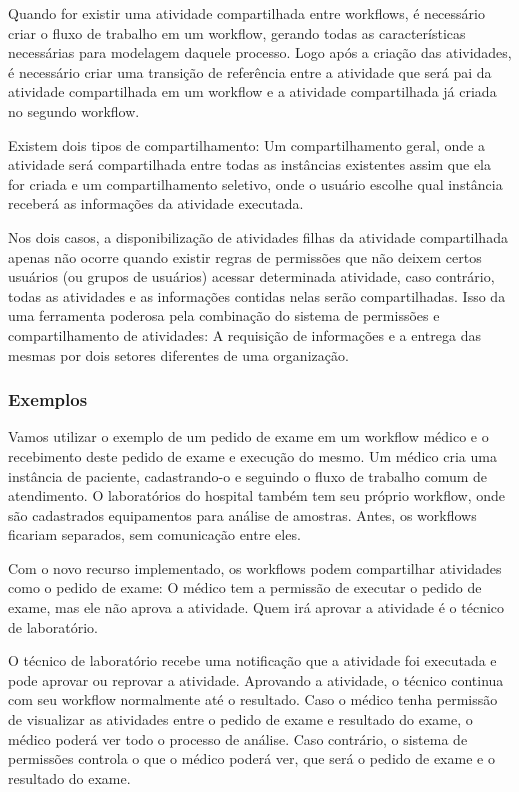 Quando for existir uma atividade compartilhada entre workflows, é necessário criar o fluxo de trabalho em um workflow, gerando todas as características necessárias para modelagem daquele processo. Logo após a criação das atividades, é necessário criar uma transição de referência entre a atividade que será pai da atividade compartilhada em um workflow e a atividade compartilhada já criada no segundo workflow.

Existem dois tipos de compartilhamento: Um compartilhamento geral, onde a atividade será compartilhada entre todas as instâncias existentes assim que ela for criada e um compartilhamento seletivo, onde o usuário escolhe qual instância receberá as informações da atividade executada.

Nos dois casos, a disponibilização de atividades filhas da atividade compartilhada apenas não ocorre quando existir regras de permissões que não deixem certos usuários (ou grupos de usuários) acessar determinada atividade, caso contrário, todas as atividades e as informações contidas nelas serão compartilhadas.
Isso da uma ferramenta poderosa pela combinação do sistema de permissões e compartilhamento de atividades: A requisição de informações e a entrega das mesmas por dois setores diferentes de uma organização.

\subsubsection{Exemplos}

Vamos utilizar o exemplo de um pedido de exame em um workflow médico e o recebimento deste pedido de exame e execução do mesmo.
Um médico cria uma instância de paciente, cadastrando-o e seguindo o fluxo de trabalho comum de atendimento.
O laboratórios do hospital também tem seu próprio workflow, onde são cadastrados equipamentos para análise de amostras.
Antes, os workflows ficariam separados, sem comunicação entre eles.

Com o novo recurso implementado, os workflows podem compartilhar atividades como o pedido de exame: O médico tem a permissão de executar o pedido de exame, mas ele não aprova a atividade. Quem irá aprovar a atividade é o técnico de laboratório.

O técnico de laboratório recebe uma notificação que a atividade foi executada e pode aprovar ou reprovar a atividade.
Aprovando a atividade, o técnico continua com seu workflow normalmente até o resultado.
Caso o médico tenha permissão de visualizar as atividades entre o pedido de exame e resultado do exame, o médico poderá ver todo o processo de análise.
Caso contrário, o sistema de permissões controla o que o médico poderá ver, que será o pedido de exame e o resultado do exame.

